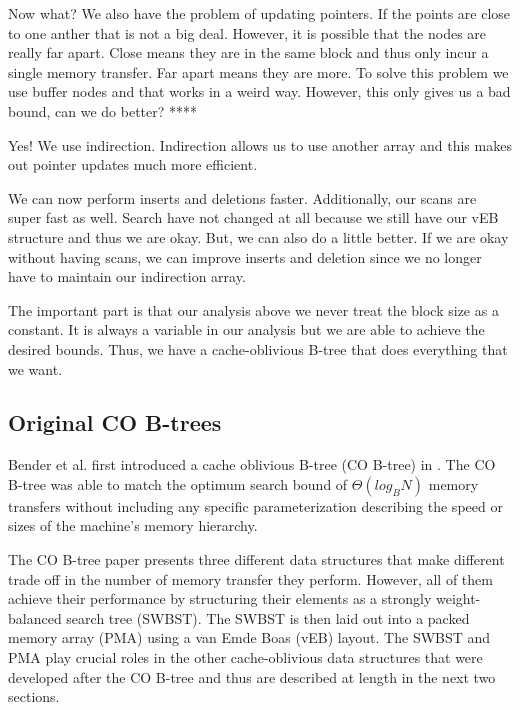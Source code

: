 \documentclass{style}
\begin{document}
Now what? We also have the problem of updating pointers. If the points are
close to one anther that is not a big deal. However, it is possible that the
nodes are really far apart. Close means they are in the same block and thus
only incur a single memory transfer. Far apart means they are more. To solve
this problem we use buffer nodes and that works in a weird way. However, this
only gives us a bad bound, can we do better? ****

Yes! We use indirection. Indirection allows us to use another array and this
makes out pointer updates much more efficient.

We can now perform inserts and deletions faster. Additionally, our scans are
super fast as well. Search have not changed at all because we still have our
vEB structure and thus we are okay. But, we can also do a little better. If we
are okay without having scans, we can improve inserts and deletion since we no
longer have to maintain our indirection array.

The important part is that our analysis above we never treat the block size as
a constant. It is always a variable in our analysis but we are able to achieve
the desired bounds. Thus, we have a cache-oblivious B-tree that does
everything that we want.















\subsection{Original CO B-trees}
\label{sec:original}

Bender et al. first introduced a cache oblivious B-tree (CO B-tree) in
\cite{cobtree}. The CO B-tree was able to match the optimum search bound of
$\Theta(log_B N)$ memory transfers without including any specific
parameterization describing the speed or sizes of the machine's memory
hierarchy.

The CO B-tree paper presents three different data structures that make
different trade off in the number of memory transfer they perform. However,
all of them achieve their performance by structuring their elements as a
strongly weight-balanced search tree (SWBST). The SWBST is then laid out into
a packed memory array (PMA) using a van Emde Boas (vEB) layout. The SWBST and
PMA play crucial roles in the other cache-oblivious data structures that were
developed after the CO B-tree and thus are described at length in the next two
sections.
\end{document}
